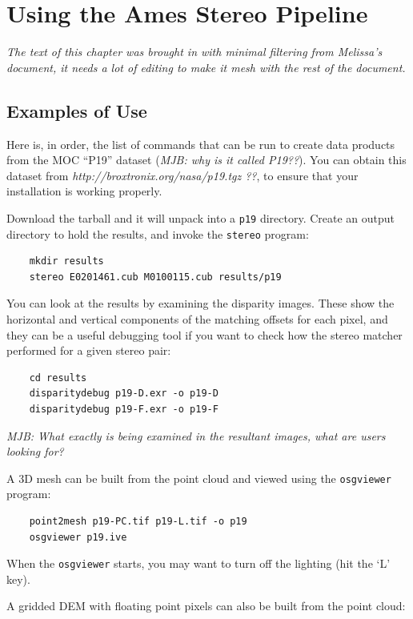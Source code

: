 \chapter{Using the Ames Stereo Pipeline}

\emph{The text of this chapter was brought in with minimal filtering from Melissa's document, it needs a lot of editing to make it mesh with the rest of the document.}

\section{Examples of Use}

Here is, in order, the list of commands that can be run to create
data products from the MOC ``P19'' dataset (\emph{MJB: why is it
called P19??}).  You can obtain this dataset from
\emph{http://broxtronix.org/nasa/p19.tgz ??}, to ensure that your
installation is working properly.

Download the tarball and it will unpack into a \texttt{p19} directory.  Create an output directory to hold the results, and invoke the \texttt{stereo} program:

\begin{verbatim}
	mkdir results
	stereo E0201461.cub M0100115.cub results/p19
\end{verbatim}

You can look at the results by examining the disparity images. These
show the horizontal and vertical components of the matching offsets
for each pixel, and they can be a useful debugging tool if you want
to check how the stereo matcher performed for a given stereo pair:

\begin{verbatim}
	cd results
	disparitydebug p19-D.exr -o p19-D     
	disparitydebug p19-F.exr -o p19-F
\end{verbatim}

\emph{MJB: What exactly is being examined in the resultant images, what are users looking for?}

A 3D mesh can be built from the point cloud and viewed using the
\texttt{osgviewer} program:

\begin{verbatim}
	point2mesh p19-PC.tif p19-L.tif -o p19
	osgviewer p19.ive
\end{verbatim}

When the \texttt{osgviewer} starts, you may want to turn off the
lighting (hit the `L' key).

A gridded DEM with floating point pixels can also be built from the point cloud:

